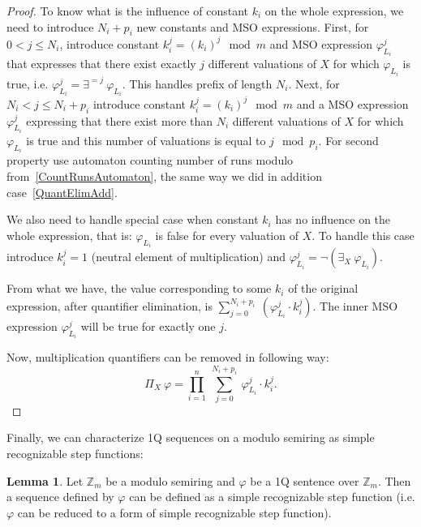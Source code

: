 \documentclass[12pt]{article}
\theoremstyle{definition}
\newtheorem{lemma}[theorem]{Lemma}
\begin{document}
\begin{proof}
    To know what is the influence of constant $k_i$ on the whole expression, we need to introduce $N_i + p_i$ new constants and MSO expressions. First, for $0 < j \leq N_i$, introduce constant $k_i^j = (k_i)^j \mod m$ and MSO expression $\varphi_{L_i}^j$ that expresses that there exist exactly $j$ different valuations of $X$ for which $\varphi_{L_i}$ is true, i.e. $\varphi_{L_i}^j = \exists^{=j} \ \varphi_{L_i}$. This handles prefix of length $N_i$. Next, for $N_i < j \leq N_i + p_i$ introduce constant $k_i^j = (k_i)^j \mod m$ and a MSO expression $\varphi_{L_i}^j$ expressing that there exist more than $N_i$ different valuations of $X$ for which $\varphi_{L_i}$ is true and this number of valuations is equal to $j \mod p_i$. For second property use automaton counting number of runs modulo from~\cref{CountRunsAutomaton}, the same way we did in addition case~\cref{QuantElimAdd}.

    We also need to handle special case when constant $k_i$ has no influence on the whole expression, that is: $\varphi_{L_i}$ is false for every valuation of $X$. To handle this case introduce $k_i^j = 1$ (neutral element of multiplication) and $\varphi_{L_i}^j = \neg(\exists_X \ \varphi_{L_i})$.

    From what we have, the value corresponding to some $k_i$ of the original expression, after quantifier elimination, is $\sum_{j = 0}^{N_i + p_i} \ (\varphi_{L_i}^j \cdot k_i^j)$. The inner MSO expression $\varphi_{L_i}^j$ will be true for exactly one $j$.
    
    Now, multiplication quantifiers can be removed in following way:
    $$\Pi_X \ \varphi = \prod_{i = 1}^n \ \sum_{j = 0}^{N_i + p_i} \ \varphi_{L_i}^j \cdot k_i^j.$$
\end{proof}

Finally, we can characterize 1Q sequences on a modulo semiring as simple recognizable step functions:

\begin{lemma}
    \label{OverModAreSimpleRec}
    Let $\mathbb{Z}_m$ be a modulo semiring and $\varphi$ be a 1Q sentence over $\mathbb{Z}_m$. Then a sequence defined by $\varphi$ can be defined as a simple recognizable step function (i.e. $\varphi$ can be reduced to a form of simple recognizable step function). 
\end{lemma}
\end{document}
